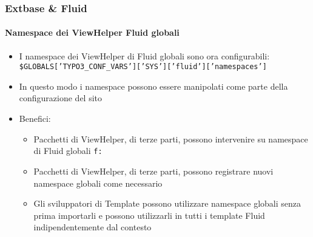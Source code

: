 \begin{frame}[fragile]
	\frametitle{Extbase \& Fluid}
	\framesubtitle{Namespace dei ViewHelper Fluid globali}

	\begin{itemize}
		\item I namespace dei ViewHelper di Fluid globali sono ora configurabili:\newline
			\smaller
				\texttt{\$GLOBALS['TYPO3\_CONF\_VARS']['SYS']['fluid']['namespaces']}
			\normalsize
		\item In questo modo i namespace possono essere manipolati come parte della configurazione del sito
		\item Benefici:

			\begin{itemize}
				\item Pacchetti di ViewHelper, di terze parti, possono intervenire su namespace di Fluid globali \texttt{f:}
				\item Pacchetti di ViewHelper, di terze parti, possono registrare nuovi namespace globali come necessario
				\item Gli sviluppatori di Template possono utilizzare namespace globali senza prima importarli
					e possono utilizzarli in tutti i template Fluid indipendentemente dal contesto
			\end{itemize}

	\end{itemize}

\end{frame}


